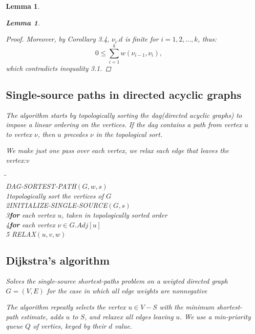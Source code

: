 \documentclass[a4paper,11pt]{book}
\newtheorem{lemma}[theorem]{Lemma}
\begin{document}
{\begin{lemma}
\begin{lemma}
\begin{proof}
Moreover, by Corollary 3.4, $\nu_i.d$ is finite for $i = 1, 2, ..., k$, thus:
\[0\leq \sum^k_{i=1} w(\nu_{i-1}, \nu_i), \]
which contradicts inequality 3.1. 
\end{proof}

\subsection{Single-source paths in directed acyclic graphs}
The algorithm starts by topologically sorting the dag(directed acyclic graphs) to impose a linear ordering on the vertices. If the dag contains a path from vertex $u$ to vertex $\nu$, then $u$ precedes $\nu$ in the topological sort. 

We make just one pass over each vertex, we relax each edge that leaves the vertex:v
\begin{tabbing}
\hspace{.8cm}\=\hspace{.8cm}\=\hspace{.8cm}\=\\
DAG-SORTEST-PATH$(G,w,s)$\\
1\>topologically sort the vertices of $G$\\
2\>INITIALIZE-SINGLE-SOURCE$(G,s)$\\
3\>\textbf{for} each vertex $u$, taken in topologically sorted order\\
4\>\>\textbf{for} each vertex $\nu\in G.Adj[u]$\\
5 \>\>\>RELAX$(u, v, w)$
\end{tabbing}
\subsection{Dijkstra's algorithm}
Solves the single-source shortest-paths problem on a weigted directed graph $G=(V,E)$ for the case in which \emph{all edge weights are nonnegative}

The algorithm repeatly selects the vertex $u \in V - S$ with the minimum shortest-path estimate, adds $u$ to $S$, and relaxex all edges leaving $u$. We use a min-priority queue $Q$ of verties, keyed by their $d$ value.


\end{lemma}
\end{lemma}}
\end{document}
